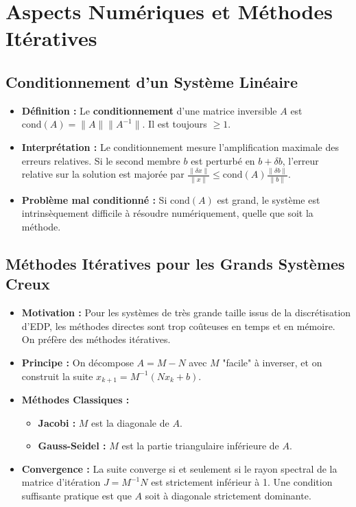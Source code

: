 \documentclass[12pt, a4paper, parskip=full]{report}
\theoremstyle{agregstyle}
\begin{document}
\section{Aspects Numériques et Méthodes Itératives}

\subsection{Conditionnement d'un Système Linéaire}
\begin{itemize}
    \item \textbf{Définition :} Le \textbf{conditionnement} d'une matrice inversible $A$ est $\mathrm{cond}(A) = \|A\| \|A^{-1}\|$. Il est toujours $\ge 1$.
    \item \textbf{Interprétation :} Le conditionnement mesure l'amplification maximale des erreurs relatives. Si le second membre $b$ est perturbé en $b+\delta b$, l'erreur relative sur la solution est majorée par $\frac{\|\delta x\|}{\|x\|} \le \mathrm{cond}(A) \frac{\|\delta b\|}{\|b\|}$.
    \item \textbf{Problème mal conditionné :} Si $\mathrm{cond}(A)$ est grand, le système est intrinsèquement difficile à résoudre numériquement, quelle que soit la méthode.
\end{itemize}

\subsection{Méthodes Itératives pour les Grands Systèmes Creux}
\begin{itemize}
    \item \textbf{Motivation :} Pour les systèmes de très grande taille issus de la discrétisation d'EDP, les méthodes directes sont trop coûteuses en temps et en mémoire. On préfère des méthodes itératives.
    \item \textbf{Principe :} On décompose $A=M-N$ avec $M$ "facile" à inverser, et on construit la suite $x_{k+1} = M^{-1}(Nx_k + b)$.
    \item \textbf{Méthodes Classiques :}
        \begin{itemize}
            \item \textbf{Jacobi :} $M$ est la diagonale de $A$.
            \item \textbf{Gauss-Seidel :} $M$ est la partie triangulaire inférieure de $A$.
        \end{itemize}
    \item \textbf{Convergence :} La suite converge si et seulement si le rayon spectral de la matrice d'itération $J=M^{-1}N$ est strictement inférieur à 1. Une condition suffisante pratique est que $A$ soit à diagonale strictement dominante.
\end{itemize}
\end{document}
